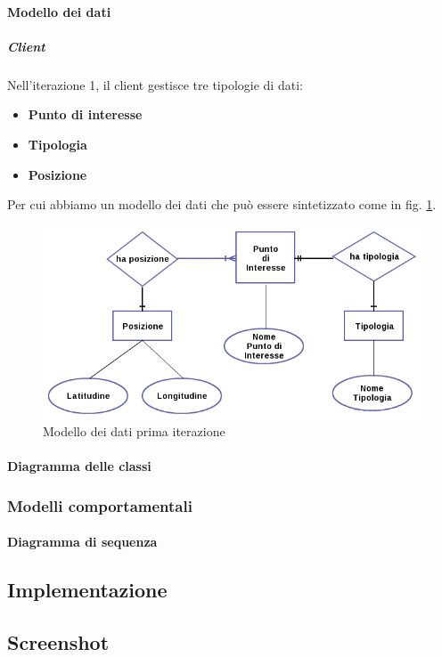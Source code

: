 \paragraph{Modello dei dati}
\subparagraph{Client}
Nell'iterazione 1, il client gestisce tre tipologie di dati:
\begin{itemize}
\item \textbf{Punto di interesse}
\item \textbf{Tipologia}
\item \textbf{Posizione}
\end{itemize}
Per cui abbiamo un modello dei dati che può essere sintetizzato come in fig. \ref{datamodel1iterazione}.
\begin{figure}
\includegraphics[scale=0.55]{imgs/model/DataModel1.png} 
\caption{Modello dei dati prima iterazione\label{datamodel1iterazione}}
\end{figure}

\paragraph{Diagramma delle classi}

\subsubsection{Modelli comportamentali}
\paragraph{Diagramma di sequenza}
\subsection{Implementazione}

\subsection{Screenshot}



